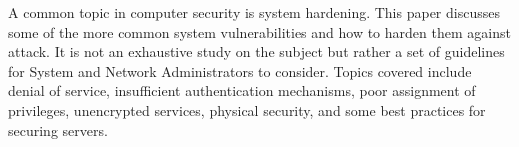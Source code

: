 \thispagestyle{empty}

A common topic in computer security is system hardening.  This paper discusses some of the more common system vulnerabilities and how to harden them against attack.  It is not an exhaustive study on the subject but rather a set of guidelines for System and Network Administrators to consider.  Topics covered include denial of service, insufficient authentication mechanisms, poor assignment of privileges, unencrypted services, physical security, and some best practices for securing servers. 

